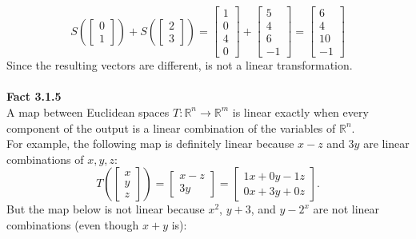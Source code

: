 \documentclass{article}
\begin{document}
\begin{equation*}
S\left(
\left[\begin{array}{c} 0 \\ 1 \end{array}\right]
\right) + S\left(
\left[\begin{array}{c} 2 \\ 3\end{array}\right]
\right)
=
\left[\begin{array}{c} 1 \\ 0 \\ 4 \\ 0 \end{array}\right] +
\left[\begin{array}{c} 5 \\ 4 \\ 6 \\ -1 \end{array}\right]
=
\left[\begin{array}{c} 6 \\ 4 \\ 10 \\ -1 \end{array}\right]
\end{equation*}
Since the resulting vectors are different, is not a linear transformation.\\
\\
\textbf{Fact 3.1.5}\\
A map between Euclidean spaces $T:\mathbb{R}^{n} \to\mathbb{R}^{m}$ is linear exactly when every component of the output is a linear combination of the variables of $\mathbb{R}^{n}$. \\
For example, the following map is definitely linear because $x-z$ and $3y$ are linear combinations of $x,y,z$:
\begin{equation*}
T\left(\left[\begin{array}{c} x \\ y \\ z \end{array}\right] \right)
=
\left[\begin{array}{c} x-z \\ 3y \end{array}\right]
=
\left[\begin{array}{c} 1x+0y-1z \\ 0x+3y+0z \end{array}\right]\text{.}
\end{equation*}
But the map below is not linear because $x^2$, $y+3$, and $y-2^{x}$ are not linear combinations (even though $x+y$ is):
\end{document}
